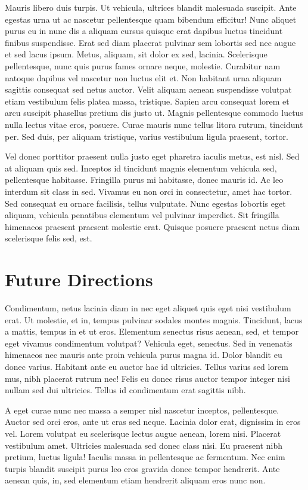 \documentclass[]{article}
\begin{document}
Mauris libero duis turpis. Ut vehicula, ultrices blandit malesuada
suscipit. Ante egestas urna ut ac nascetur pellentesque quam bibendum
efficitur! Nunc aliquet purus eu in nunc dis a aliquam cursus quisque
erat dapibus luctus tincidunt finibus suspendisse. Erat sed diam
placerat pulvinar sem lobortis sed nec augue et sed lacus ipsum. Metus,
aliquam, sit dolor ex sed, lacinia. Scelerisque pellentesque, nunc quis
purus fames ornare neque, molestie. Curabitur nam natoque dapibus vel
nascetur non luctus elit et. Non habitant urna aliquam sagittis
consequat sed netus auctor. Velit aliquam aenean suspendisse volutpat
etiam vestibulum felis platea massa, tristique. Sapien arcu consequat
lorem et arcu suscipit phasellus pretium dis justo ut. Magnis
pellentesque commodo luctus nulla lectus vitae eros, posuere. Curae
mauris nunc tellus litora rutrum, tincidunt per. Sed duis, per aliquam
tristique, varius vestibulum ligula praesent, tortor.

Vel donec porttitor praesent nulla justo eget pharetra iaculis metus,
est nisl. Sed at aliquam quis sed. Inceptos id tincidunt magnis
elementum vehicula sed, pellentesque habitasse. Fringilla purus mi
habitasse, donec mauris id. Ac leo interdum sit class in sed. Vivamus eu
non orci in consectetur, amet hac tortor. Sed consequat eu ornare
facilisis, tellus vulputate. Nunc egestas lobortis eget aliquam,
vehicula penatibus elementum vel pulvinar imperdiet. Sit fringilla
himenaeos praesent praesent molestie erat. Quisque posuere praesent
netus diam scelerisque felis sed, est.

\hypertarget{future-directions}{%
\section{Future Directions}\label{future-directions}}

Condimentum, netus lacinia diam in nec eget aliquet quis eget nisi
vestibulum erat. Ut molestie, et in, tempus pulvinar sodales montes
magnis. Tincidunt, lacus a mattis, tempus in et ut eros. Elementum
senectus risus aenean, sed, et tempor eget vivamus condimentum volutpat?
Vehicula eget, senectus. Sed in venenatis himenaeos nec mauris ante
proin vehicula purus magna id. Dolor blandit eu donec varius. Habitant
ante eu auctor hac id ultricies. Tellus varius sed lorem mus, nibh
placerat rutrum nec! Felis eu donec risus auctor tempor integer nisi
nullam sed dui ultricies. Tellus id condimentum erat sagittis nibh.

A eget curae nunc nec massa a semper nisl nascetur inceptos,
pellentesque. Auctor sed orci eros, ante ut cras sed neque. Lacinia
dolor erat, dignissim in eros vel. Lorem volutpat eu scelerisque lectus
augue aenean, lorem nisi. Placerat vestibulum amet. Ultricies malesuada
sed donec class nisi. Eu praesent nibh pretium, luctus ligula! Iaculis
massa in pellentesque ac fermentum. Nec enim turpis blandit suscipit
purus leo eros gravida donec tempor hendrerit. Ante aenean quis, in, sed
elementum etiam hendrerit aliquam eros nunc non.
\end{document}
